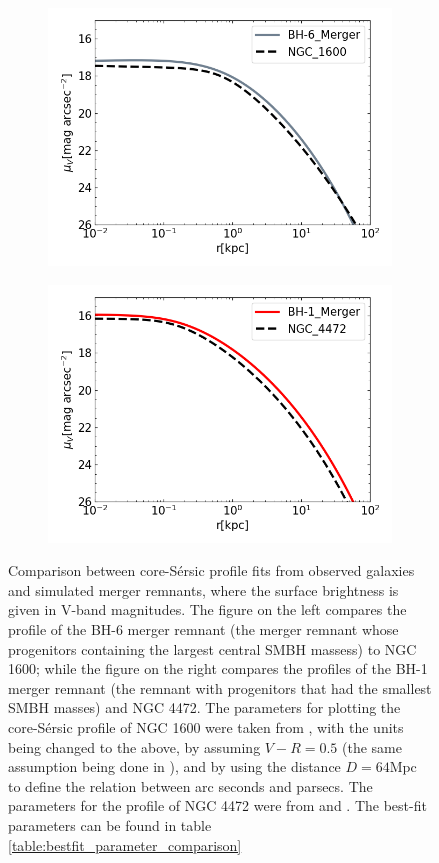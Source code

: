 \documentclass[english, oneside]{HYgradu}
\begin{document}
\begin{figure}
	\centering
	\begin{subfigure}[b]{0.49\textwidth}
		\includegraphics[width=\textwidth]{BH-6_NGC1600.png}
	\end{subfigure}
	\begin{subfigure}[b]{0.49\textwidth}
		\includegraphics[width=\textwidth]{BH-1_NGC4472.png}
	\end{subfigure}
	\caption{Comparison between core-Sérsic profile fits from observed galaxies and simulated merger remnants, where the surface brightness is given in V-band magnitudes. The figure on the left compares the profile of the BH-6 merger remnant (the merger remnant whose progenitors containing the largest central SMBH massess) to NGC 1600; while the figure on the right compares the profiles of the BH-1 merger remnant (the remnant with progenitors that had the smallest SMBH masses) and NGC 4472. The parameters for plotting the core-Sérsic profile of NGC 1600 were taken from \cite{Thomas2016}, with the units being changed to the above, by assuming $V - R = 0.5$ (the same assumption being done in \cite{Lauer2007}), and by using the distance $D = 64 \mathrm{Mpc}$ \citep{Thomas2016} to define the relation between arc seconds and parsecs. The parameters for the profile of NGC 4472 were from \cite{Dullo2012} and \cite{Lauer2007}. The best-fit parameters can be found in table \ref{table:bestfit_parameter_comparison}}

\end{figure}
\end{document}
